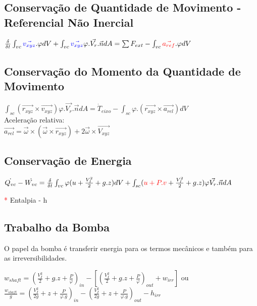 \documentclass[a4paper, 12pt]{article}
\begin{document}
\subsection{Conservação de Quantidade de Movimento - Referencial Não Inercial}
	\begin{center}
		\Large
		$
		\frac{\delta}{\delta t}\int_{vc}\textcolor{blue}{\vec{v_{xyz}}}.\varphi dV + \int_{vc}\textcolor{blue}{\vec{v_{xyz}}}\varphi.\vec{V_{r}} .\vec{n}dA = \sum F_{ext} - \int_{vc} \textcolor{red}{\vec{a_{ref}}} .\varphi dV   
		$
	\end{center}

\subsection{Conservação do Momento da Quantidade de Movimento}
	\begin{center}
		\Large
		$
		\int_{sc}(\vec{r_{xyz}}\times \vec{v_{xyz}})\varphi .\vec{V_{r}}.\vec{n} dA = \dot{T}_{eixo} - \int_{sc} \varphi .(\vec{r_{xyz}}\times \vec{a_{rel}})dV
		$\\
		Aceleração relativa:\\
		$
		\vec{a_{rel}} = \vec{\omega} \times (\vec{\omega} \times \vec{r_{xyz}}) + 2\vec{\omega} \times \vec{V_{xyz}}
		$
		
	\end{center}

\subsection{Conservação de Energia}
	\begin{center}
		\Large
		$
		\dot{Q_{vc}} - \dot{W_{vc}} = \frac{\delta}{\delta t} \int_{vc} \varphi (u + \frac{V_I^2}{2} + g.z)dV+ \int_{sc}(\textcolor{red}{u + P.v} + \frac{V_I^2}{2}+g.z)\varphi \vec{V_r}.\vec{n}dA
		$
	\end{center}
	\textcolor{red}{*} Entalpia - h

\subsection{Trabalho da Bomba}
	O papel da bomba é transferir energia para os termos mecânicos e também para as irreversibilidades.
	\begin{center}
		\Large
		$
		w_{shaft} = (\frac{V_I^2}{2} + g.z + \frac{P}{\varphi})_{in} - [(\frac{V_I^2}{2} + g.z + \frac{P}{\varphi} )_{out} + w_{irr}]
		$ ou\\
		$
		\frac{w_{shaft}}{g} = (\frac{V_I^2}{2g} + z + \frac{P}{\varphi .g})_{in} - (\frac{V_I^2}{2g} + z + \frac{P}{\varphi .g} )_{out} - h_{irr}
		$
	\end{center}
\end{document}
